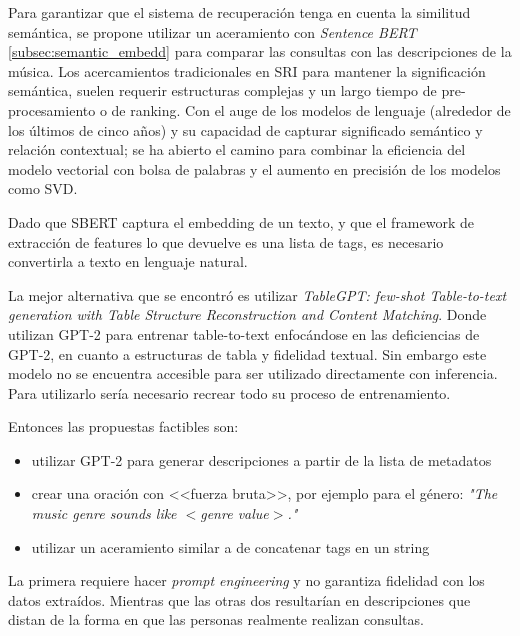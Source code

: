 Para garantizar que el sistema de recuperación tenga en cuenta la similitud semántica, se propone utilizar un aceramiento con \textit{Sentence BERT} \ref{subsec:semantic_embedd} para comparar las consultas con las descripciones de la música. Los acercamientos tradicionales en SRI para mantener la significación semántica, suelen requerir estructuras complejas y un largo tiempo de pre-procesamiento o de ranking. Con el auge de los modelos de lenguaje (alrededor de los últimos de cinco años) y su capacidad de capturar significado semántico y relación contextual; se ha abierto el camino para combinar la eficiencia del modelo vectorial con bolsa de palabras y el aumento en precisión de los modelos como SVD. 

Dado que SBERT captura el embedding de un texto, y que el framework de extracción de features lo que devuelve es una lista de tags, es necesario 
convertirla a texto en lenguaje natural.  %

La mejor alternativa que se encontró es utilizar \textit{TableGPT: few-shot Table-to-text generation with Table Structure Reconstruction and Content Matching}. Donde utilizan GPT-2 para entrenar table-to-text enfocándose en las deficiencias de GPT-2, en cuanto a estructuras de tabla y fidelidad textual. Sin embargo este modelo no se encuentra accesible para ser utilizado directamente con inferencia. Para utilizarlo sería necesario recrear todo su proceso de entrenamiento. %

Entonces las propuestas factibles son: 
\begin{itemize}
    \item utilizar GPT-2 para generar descripciones a partir de la lista de metadatos
    \item crear una oración con <<fuerza bruta>>, por ejemplo para el género: \textit{"The music genre sounds like $<$genre value$>$."}
    \item utilizar un aceramiento similar a \cite{Manco2022ContrastiveAL} de concatenar tags en un string
\end{itemize}
La primera requiere hacer \textit{prompt engineering} y no garantiza fidelidad con los datos extraídos. Mientras que las otras dos resultarían en descripciones que distan de la forma en que las personas realmente realizan consultas. 

